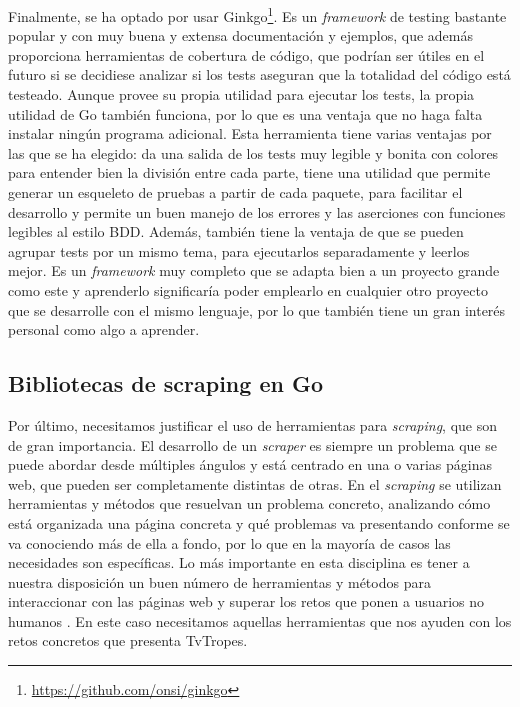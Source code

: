 Finalmente, se ha optado por usar
Ginkgo\footnote{\url{https://github.com/onsi/ginkgo}}. Es un \textit{framework}
de testing bastante popular y con muy buena y extensa documentación y ejemplos,
que además proporciona herramientas de cobertura de código, que podrían ser
útiles en el futuro si se decidiese analizar si los tests aseguran que la
totalidad del código está testeado. Aunque provee su propia utilidad para
ejecutar los tests, la propia utilidad de Go también funciona, por lo que es una
ventaja que no haga falta instalar ningún programa adicional. Esta herramienta
tiene varias ventajas por las que se ha elegido: da una salida de los tests muy
legible y bonita con colores para entender bien la división entre cada parte,
tiene una utilidad que permite generar un esqueleto de pruebas a partir de cada
paquete, para facilitar el desarrollo y permite un buen manejo de los errores y
las aserciones con funciones legibles al estilo BDD. Además, también tiene la
ventaja de que se pueden agrupar tests por un mismo tema, para ejecutarlos
separadamente y leerlos mejor. Es un \textit{framework} muy completo que se
adapta bien a un proyecto grande como este y aprenderlo significaría poder
emplearlo en cualquier otro proyecto que se desarrolle con el mismo lenguaje,
por lo que también tiene un gran interés personal como algo a aprender.

\subsection{Bibliotecas de scraping en Go}
Por último, necesitamos justificar el uso de herramientas para
\textit{scraping}, que son de gran importancia. El desarrollo de un
\textit{scraper} es siempre un problema que se puede abordar desde múltiples
ángulos y está centrado en una o varias páginas web, que pueden ser
completamente distintas de otras. En el \textit{scraping} se utilizan
herramientas y métodos que resuelvan un problema concreto, analizando cómo está
organizada una página concreta y qué problemas va presentando conforme se va
conociendo más de ella a fondo, por lo que en la mayoría de casos las
necesidades son específicas. Lo más importante en esta disciplina es tener a
nuestra disposición un buen número de herramientas y métodos para interaccionar
con las páginas web y superar los retos que ponen a usuarios no humanos
\cite{apress2018scraping}. En este caso necesitamos aquellas herramientas que
nos ayuden con los retos concretos que presenta TvTropes.

